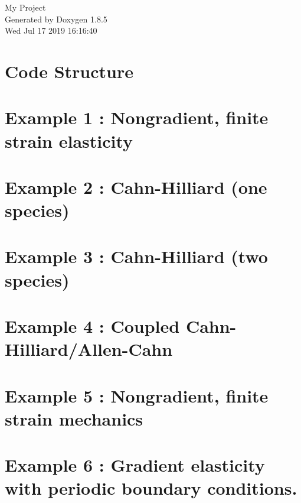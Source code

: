 \documentclass[twoside]{book}
\newcommand{\clearemptydoublepage}{%
  \newpage{\pagestyle{empty}\cleardoublepage}%
}
\begin{document}
\hypersetup{pageanchor=false}
\begin{titlepage}
\vspace*{7cm}
\begin{center}%
{\Large My Project }\\
\vspace*{1cm}
{\large Generated by Doxygen 1.8.5}\\
\vspace*{0.5cm}
{\small Wed Jul 17 2019 16:16:40}\\
\end{center}
\end{titlepage}
\clearemptydoublepage
\tableofcontents
\clearemptydoublepage
{}
\hypersetup{pageanchor=true}

\chapter{Code Structure}
\label{codestructure}
\hypertarget{codestructure}{}

\chapter{Example 1 \-: Nongradient, finite strain elasticity}
\label{example1}
\hypertarget{example1}{}

\chapter{Example 2 \-: Cahn-\/\-Hilliard (one species)}
\label{example2}
\hypertarget{example2}{}

\chapter{Example 3 \-: Cahn-\/\-Hilliard (two species)}
\label{example3}
\hypertarget{example3}{}

\chapter{Example 4 \-: Coupled Cahn-\/\-Hilliard/\-Allen-\/\-Cahn}
\label{example4}
\hypertarget{example4}{}

\chapter{Example 5 \-: Nongradient, finite strain mechanics}
\label{example5}
\hypertarget{example5}{}

\chapter{Example 6 \-: Gradient elasticity with periodic boundary conditions.}
\label{example6}
\hypertarget{example6}{}

\end{document}
